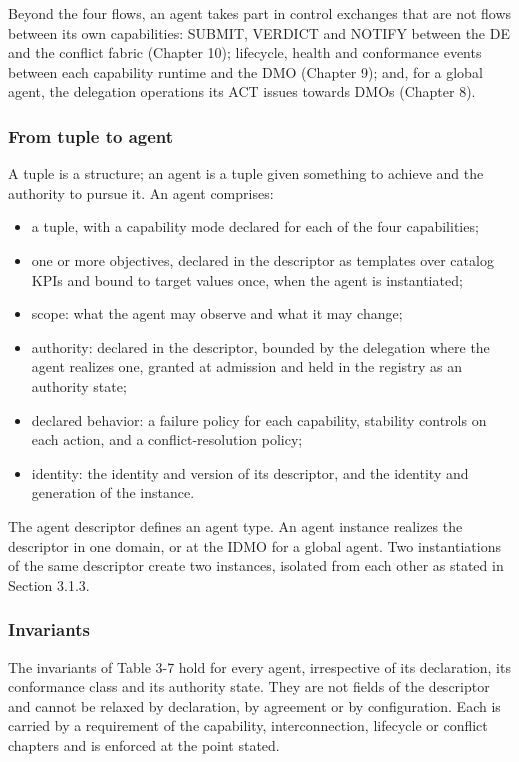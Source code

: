 Beyond the four flows, an agent takes part in control exchanges that are
not flows between its own capabilities: SUBMIT, VERDICT and NOTIFY
between the DE and the conflict fabric (Chapter 10); lifecycle, health
and conformance events between each capability runtime and the DMO
(Chapter 9); and, for a global agent, the delegation operations its ACT
issues towards DMOs (Chapter 8).

\hypertarget{from-tuple-to-agent}{%
\subsubsection{From tuple to agent}\label{from-tuple-to-agent}}

A tuple is a structure; an agent is a tuple given something to achieve
and the authority to pursue it. An agent comprises:

\begin{itemize}
\tightlist
\item
  a tuple, with a capability mode declared for each of the four
  capabilities;
\item
  one or more objectives, declared in the descriptor as templates over
  catalog KPIs and bound to target values once, when the agent is
  instantiated;
\item
  scope: what the agent may observe and what it may change;
\item
  authority: declared in the descriptor, bounded by the delegation where
  the agent realizes one, granted at admission and held in the registry
  as an authority state;
\item
  declared behavior: a failure policy for each capability, stability
  controls on each action, and a conflict-resolution policy;
\item
  identity: the identity and version of its descriptor, and the identity
  and generation of the instance.
\end{itemize}

The agent descriptor defines an agent type. An agent instance realizes
the descriptor in one domain, or at the IDMO for a global agent. Two
instantiations of the same descriptor create two instances, isolated
from each other as stated in Section 3.1.3.

\hypertarget{invariants}{%
\subsubsection{Invariants}\label{invariants}}

The invariants of Table 3-7 hold for every agent, irrespective of its
declaration, its conformance class and its authority state. They are not
fields of the descriptor and cannot be relaxed by declaration, by
agreement or by configuration. Each is carried by a requirement of the
capability, interconnection, lifecycle or conflict chapters and is
enforced at the point stated.

